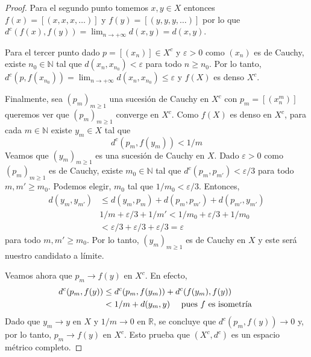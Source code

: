 \documentclass{article}
\theoremstyle{plain}
\theoremstyle{definition}
\newcommand{\R}{\mathbb{R}}
\newcommand{\N}{\mathbb{N}}
\begin{document}
\begin{proof}
    Para el segundo punto tomemos \( x, y \in X \) entonces \( f(x) = [(x, x, x, \ldots)] \) y \( f(y) = [(y, y, y, \ldots)] \)
    por lo que \( d^c(f(x), f(y)) = \lim_{n \to +\infty} d(x, y) = d(x, y)\).

    Para el tercer punto dado \( p = [(x_n)] \in X^c \) y \( \varepsilon > 0 \) como \( (x_n) \) es de Cauchy, existe \( n_0 \in \N \) tal que \( d(x_n, x_{n_0}) < \varepsilon \)
    para todo \( n \geq n_0 \). Por lo tanto, \( d^c(p, f(x_{n_0})) = \lim_{n \to +\infty} d(x_n, x_{n_0}) \leq \varepsilon \) y \( f(X) \) es denso \( X^c \).

    Finalmente, sea \( {(p_m)}_{m \geq 1} \) una sucesión de Cauchy en \( X^c \) con \( p_m = [(x_n^m)] \) queremos ver que \( {(p_m)}_{m \geq 1} \) converge en \( X^c \).
    Como \( f(X) \) es denso en \( X^c \), para cada \( m \in \N \) existe \( y_m \in X \) tal que \[
        d^c(p_m, f(y_m)) < 1/m
    \]
    Veamos que \( {(y_m)}_{m \geq 1} \) es una sucesión de Cauchy en \( X \). Dado \( \varepsilon > 0 \) como \( {(p_m)}_{m \geq 1} \) es de Cauchy, existe
    \( m_0 \in \N \) tal que \( d^c(p_m, p_{m'}) < \varepsilon/3 \) para todo \( m, m' \geq m_0 \). Podemos elegir, \( m_0 \) tal que \( 1/m_0 < \varepsilon/3 \). Entonces,\begin{align*}
        d(y_m, y_{m'}) & \leq d(y_m, p_m) + d(p_m, p_{m'}) + d(p_{m'}, y_{m'})         \\
                       & 1/m + \varepsilon/3 + 1/m' < 1/m_0 + \varepsilon/3 + 1/m_0    \\
                       & < \varepsilon/3 + \varepsilon/3 + \varepsilon/3 = \varepsilon
    \end{align*}
    para todo \( m, m' \geq m_0 \). Por lo tanto, \( {(y_m)}_{m \geq 1} \) es de Cauchy en \( X \) y este será nuestro candidato a límite.

    Veamos ahora que \( p_m \to f(y) \) en \( X^c \). En efecto,\begin{align*}
        d^c(p_m, f(y)) & \leq d^c(p_m, f(y_m)) + d^c(f(y_m), f(y))                  \\
                       & < 1/m + d(y_m, y) \quad \text{ pues \( f \) es isometría } \\
    \end{align*}
    Dado que \( y_m \to y \) en \( X \) y \( 1/m \to 0 \) en \( \R \), se concluye que \( d^c(p_m, f(y)) \to 0 \) y, por lo tanto, \( p_m \to f(y) \) en \( X^c \).
    Esto prueba que \( (X^c, d^c) \) es un espacio métrico completo.


\end{proof}
\end{document}
